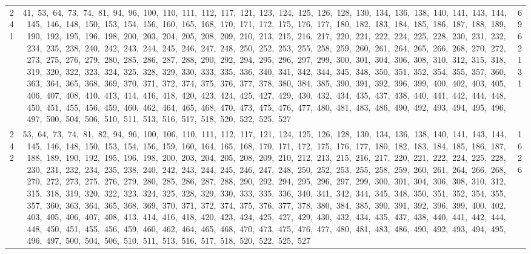 \begin{longtable}{c|p{}|r}
241 & 41,\ 53,\ 64,\ 73,\ 74,\ 81,\ 94,\ 96,\ 100,\ 110,\ 111,\ 112,\ 117,\ 121,\ 123,\ 124,\ 125,\ 126,\ 128,\ 130,\ 134,\ 136,\ 138,\ 140,\ 141,\ 143,\ 144,\ 145,\ 146,\ 148,\ 150,\ 153,\ 154,\ 156,\ 160,\ 165,\ 168,\ 170,\ 171,\ 172,\ 175,\ 176,\ 177,\ 180,\ 182,\ 183,\ 184,\ 185,\ 186,\ 187,\ 188,\ 189,\ 190,\ 192,\ 195,\ 196,\ 198,\ 200,\ 203,\ 204,\ 205,\ 208,\ 209,\ 210,\ 213,\ 215,\ 216,\ 217,\ 220,\ 221,\ 222,\ 224,\ 225,\ 228,\ 230,\ 231,\ 232,\ 234,\ 235,\ 238,\ 240,\ 242,\ 243,\ 244,\ 245,\ 246,\ 247,\ 248,\ 250,\ 252,\ 253,\ 255,\ 258,\ 259,\ 260,\ 261,\ 264,\ 265,\ 266,\ 268,\ 270,\ 272,\ 273,\ 275,\ 276,\ 279,\ 280,\ 285,\ 286,\ 287,\ 288,\ 290,\ 292,\ 294,\ 295,\ 296,\ 297,\ 299,\ 300,\ 301,\ 304,\ 306,\ 308,\ 310,\ 312,\ 315,\ 318,\ 319,\ 320,\ 322,\ 323,\ 324,\ 325,\ 328,\ 329,\ 330,\ 333,\ 335,\ 336,\ 340,\ 341,\ 342,\ 344,\ 345,\ 348,\ 350,\ 351,\ 352,\ 354,\ 355,\ 357,\ 360,\ 363,\ 364,\ 365,\ 368,\ 369,\ 370,\ 371,\ 372,\ 374,\ 375,\ 376,\ 377,\ 378,\ 380,\ 384,\ 385,\ 390,\ 391,\ 392,\ 396,\ 399,\ 400,\ 402,\ 403,\ 405,\ 406,\ 407,\ 408,\ 410,\ 413,\ 414,\ 416,\ 418,\ 420,\ 423,\ 424,\ 425,\ 427,\ 429,\ 430,\ 432,\ 434,\ 435,\ 437,\ 438,\ 440,\ 441,\ 442,\ 444,\ 448,\ 450,\ 451,\ 455,\ 456,\ 459,\ 460,\ 462,\ 464,\ 465,\ 468,\ 470,\ 473,\ 475,\ 476,\ 477,\ 480,\ 481,\ 483,\ 486,\ 490,\ 492,\ 493,\ 494,\ 495,\ 496,\ 497,\ 500,\ 504,\ 506,\ 510,\ 511,\ 513,\ 516,\ 517,\ 518,\ 520,\ 522,\ 525,\ 527 & 6962131 \\
242 & 53,\ 64,\ 73,\ 74,\ 81,\ 82,\ 94,\ 96,\ 100,\ 106,\ 110,\ 111,\ 112,\ 117,\ 121,\ 124,\ 125,\ 126,\ 128,\ 130,\ 134,\ 136,\ 138,\ 140,\ 141,\ 143,\ 144,\ 145,\ 146,\ 148,\ 150,\ 153,\ 154,\ 156,\ 159,\ 160,\ 164,\ 165,\ 168,\ 170,\ 171,\ 172,\ 175,\ 176,\ 177,\ 180,\ 182,\ 183,\ 184,\ 185,\ 186,\ 187,\ 188,\ 189,\ 190,\ 192,\ 195,\ 196,\ 198,\ 200,\ 203,\ 204,\ 205,\ 208,\ 209,\ 210,\ 212,\ 213,\ 215,\ 216,\ 217,\ 220,\ 221,\ 222,\ 224,\ 225,\ 228,\ 230,\ 231,\ 232,\ 234,\ 235,\ 238,\ 240,\ 242,\ 243,\ 244,\ 245,\ 246,\ 247,\ 248,\ 250,\ 252,\ 253,\ 255,\ 258,\ 259,\ 260,\ 261,\ 264,\ 266,\ 268,\ 270,\ 272,\ 273,\ 275,\ 276,\ 279,\ 280,\ 285,\ 286,\ 287,\ 288,\ 290,\ 292,\ 294,\ 295,\ 296,\ 297,\ 299,\ 300,\ 301,\ 304,\ 306,\ 308,\ 310,\ 312,\ 315,\ 318,\ 319,\ 320,\ 322,\ 323,\ 324,\ 325,\ 328,\ 329,\ 330,\ 333,\ 335,\ 336,\ 340,\ 341,\ 342,\ 344,\ 345,\ 348,\ 350,\ 351,\ 352,\ 354,\ 355,\ 357,\ 360,\ 363,\ 364,\ 365,\ 368,\ 369,\ 370,\ 371,\ 372,\ 374,\ 375,\ 376,\ 377,\ 378,\ 380,\ 384,\ 385,\ 390,\ 391,\ 392,\ 396,\ 399,\ 400,\ 402,\ 403,\ 405,\ 406,\ 407,\ 408,\ 413,\ 414,\ 416,\ 418,\ 420,\ 423,\ 424,\ 425,\ 427,\ 429,\ 430,\ 432,\ 434,\ 435,\ 437,\ 438,\ 440,\ 441,\ 442,\ 444,\ 448,\ 450,\ 451,\ 455,\ 456,\ 459,\ 460,\ 462,\ 464,\ 465,\ 468,\ 470,\ 473,\ 475,\ 476,\ 477,\ 480,\ 481,\ 483,\ 486,\ 490,\ 492,\ 493,\ 494,\ 495,\ 496,\ 497,\ 500,\ 504,\ 506,\ 510,\ 511,\ 513,\ 516,\ 517,\ 518,\ 520,\ 522,\ 525,\ 527 & 1626 \\

\end{longtable}
